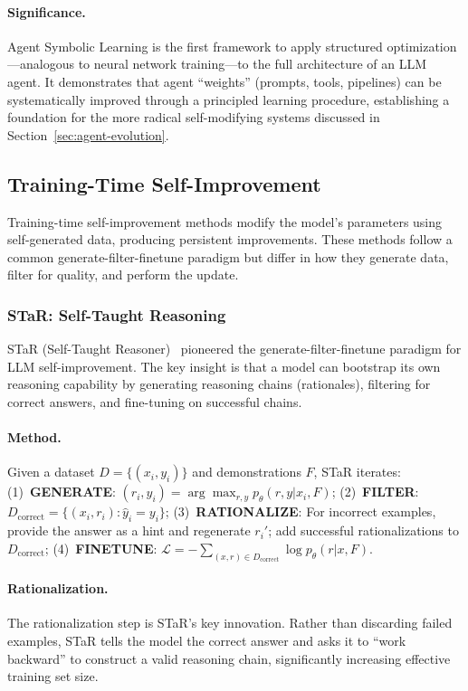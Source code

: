 \paragraph{Significance.}
Agent Symbolic Learning is the first framework to apply structured optimization---analogous to neural network training---to the full architecture of an LLM agent. It demonstrates that agent ``weights'' (prompts, tools, pipelines) can be systematically improved through a principled learning procedure, establishing a foundation for the more radical self-modifying systems discussed in Section~\ref{sec:agent-evolution}.

\subsection{Training-Time Self-Improvement}
\label{sec:training-time}

Training-time self-improvement methods modify the model's parameters using self-generated data, producing persistent improvements. These methods follow a common generate-filter-finetune paradigm but differ in how they generate data, filter for quality, and perform the update.

\subsubsection{STaR: Self-Taught Reasoning}
\label{sec:star}

STaR (Self-Taught Reasoner)~\citep{zelikman2022star} pioneered the generate-filter-finetune paradigm for LLM self-improvement. The key insight is that a model can bootstrap its own reasoning capability by generating reasoning chains (rationales), filtering for correct answers, and fine-tuning on successful chains.

\paragraph{Method.}
Given a dataset $D = \{(x_i, y_i)\}$ and demonstrations $F$, STaR iterates: (1)~\textbf{GENERATE}: $(r_i, \hat{y}_i) = \arg\max_{r,y} p_\theta(r, y | x_i, F)$; (2)~\textbf{FILTER}: $D_{\text{correct}} = \{(x_i, r_i) : \hat{y}_i = y_i\}$; (3)~\textbf{RATIONALIZE}: For incorrect examples, provide the answer as a hint and regenerate $r_i'$; add successful rationalizations to $D_{\text{correct}}$; (4)~\textbf{FINETUNE}: $\mathcal{L} = -\sum_{(x,r) \in D_{\text{correct}}} \log p_\theta(r | x, F)$.

\paragraph{Rationalization.}
The rationalization step is STaR's key innovation. Rather than discarding failed examples, STaR tells the model the correct answer and asks it to ``work backward'' to construct a valid reasoning chain, significantly increasing effective training set size.

